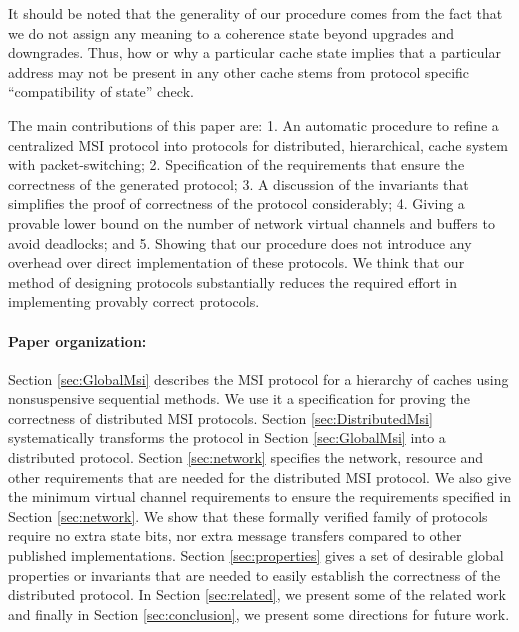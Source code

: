 It should be noted that the generality of our procedure comes from the fact
that we do not assign any meaning to a coherence state beyond upgrades and
downgrades. Thus, how or why a particular cache state implies that a particular
address may not be present in any other cache stems from protocol specific
``compatibility of state'' check. 

The main contributions of this paper are: 1. An automatic procedure to refine a
centralized MSI protocol into protocols for
distributed, hierarchical, cache system with packet-switching; 2. Specification
of the requirements that ensure the correctness of the generated protocol;
3. A discussion of the invariants that simplifies the proof of correctness of
the protocol considerably;
4. Giving a provable lower bound on the number of network virtual channels and
buffers to avoid deadlocks; and 5. Showing that our procedure does not
introduce any overhead over direct implementation of these protocols. We think
that our method of designing protocols substantially reduces the required
effort in implementing provably correct protocols. 

\paragraph{Paper organization:} Section \ref{sec:GlobalMsi} describes the MSI
protocol for a hierarchy of caches using nonsuspensive sequential methods. We
use it a specification for proving the correctness of distributed MSI
protocols. Section \ref{sec:DistributedMsi} systematically transforms the
protocol in Section \ref{sec:GlobalMsi} into a distributed protocol. Section
\ref{sec:network} specifies the network, resource and other requirements that
are needed for the distributed MSI protocol. We also give the minimum virtual
channel requirements to ensure the requirements specified in Section
\ref{sec:network}. We show that these formally verified family of protocols
require no extra state bits, nor extra message transfers compared to other
published implementations.  Section \ref{sec:properties} gives a set of
desirable global properties or invariants that are needed to easily establish
the correctness of the distributed protocol.
In Section \ref{sec:related}, we present some of the related work and finally
in Section \ref{sec:conclusion}, we present some directions for future work.
